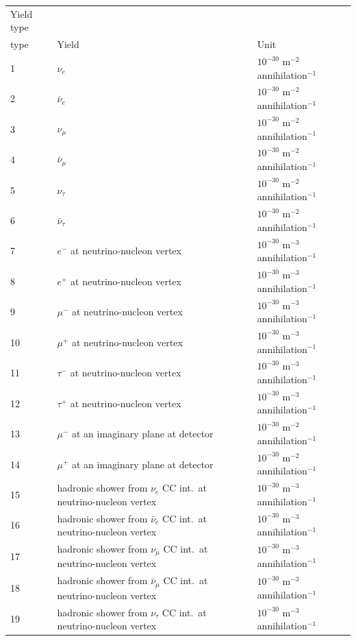 \documentclass[a4paper,10pt,oneside]{book}
\newcommand{\code}[1]{\ft{#1}}
\newcommand{\ft}[1]{\textsf{#1}}
\begin{document}
\begin{table}
\begin{tabular}{lll}
Yield type & & \\
\code{type} & Yield & Unit \\ \hline
1 & $\nu_e$ & $10^{-30}$ m$^{-2}$ annihilation$^{-1}$ \\
2 & $\bar{\nu}_e$ & $10^{-30}$ m$^{-2}$ annihilation$^{-1}$ \\
3 & $\nu_\mu$ & $10^{-30}$ m$^{-2}$ annihilation$^{-1}$ \\
4 & $\bar{\nu}_\mu$ & $10^{-30}$ m$^{-2}$ annihilation$^{-1}$ \\
5 & $\nu_\tau$ & $10^{-30}$ m$^{-2}$ annihilation$^{-1}$ \\
6 & $\bar{\nu}_\tau$ & $10^{-30}$ m$^{-2}$ annihilation$^{-1}$ \\
7 & $e^-$ at neutrino-nucleon vertex & $10^{-30}$ m$^{-3}$ annihilation$^{-1}$ \\
8 & $e^+$ at neutrino-nucleon vertex & $10^{-30}$ m$^{-3}$ annihilation$^{-1}$ \\
9 & $\mu^-$ at neutrino-nucleon vertex & $10^{-30}$ m$^{-3}$ annihilation$^{-1}$ \\
10 & $\mu^+$ at neutrino-nucleon vertex & $10^{-30}$ m$^{-3}$ annihilation$^{-1}$ \\
11 & $\tau^-$ at neutrino-nucleon vertex & $10^{-30}$ m$^{-3}$ annihilation$^{-1}$ \\
12 & $\tau^+$ at neutrino-nucleon vertex & $10^{-30}$ m$^{-3}$ annihilation$^{-1}$ \\
13 & $\mu^-$ at an imaginary plane at detector & $10^{-30}$ m$^{-2}$ annihilation$^{-1}$ \\
14 & $\mu^+$ at an imaginary plane at detector & $10^{-30}$ m$^{-2}$ annihilation$^{-1}$ \\
15 & hadronic shower from $\nu_e$ CC int.\ at neutrino-nucleon vertex & $10^{-30}$ m$^{-3}$ annihilation$^{-1}$ \\
16 & hadronic shower from $\bar{\nu}_e$ CC int.\ at neutrino-nucleon vertex & $10^{-30}$ m$^{-3}$ annihilation$^{-1}$ \\
17 & hadronic shower from $\nu_\mu$ CC int.\ at neutrino-nucleon vertex & $10^{-30}$ m$^{-3}$ annihilation$^{-1}$ \\
18 & hadronic shower from $\bar{\nu}_\mu$ CC int.\ at neutrino-nucleon vertex & $10^{-30}$ m$^{-3}$ annihilation$^{-1}$ \\
19 & hadronic shower from $\nu_\tau$ CC int.\ at neutrino-nucleon vertex & $10^{-30}$ m$^{-3}$ annihilation$^{-1}$ \\

\end{tabular}
\end{table}
\end{document}
